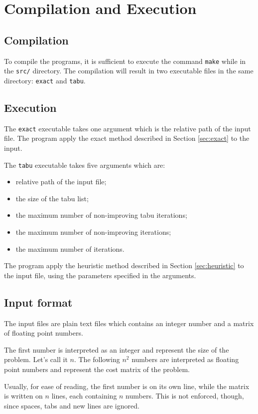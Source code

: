 \documentclass{article}
\begin{document}
\section{Compilation and Execution}

\subsection{Compilation}
To compile the programs, it is sufficient to execute the command \texttt{make} while in the \texttt{src/} directory.
The compilation will result in two executable files in the same directory: \texttt{exact} and \texttt{tabu}.

\subsection{Execution}
The \texttt{exact} executable takes one argument which is the relative path of the input file.
The program apply the exact method described in Section \ref{sec:exact} to the input.

The \texttt{tabu} executable takes five arguments which are:
\begin{itemize}
    \item relative path of the input file;
    \item the size of the tabu list;
    \item the maximum number of non-improving tabu iterations;
    \item the maximum number of non-improving iterations;
    \item the maximum number of iterations.
\end{itemize}
The program apply the heuristic method described in Section \ref{sec:heuristic} to the input file, using the parameters specified in the arguments.

\subsection{Input format}
The input files are plain text files which contains an integer number and a matrix of floating point numbers.

The first number is interpreted as an integer and represent the size of the problem. Let's call it $n$.
The following $n^2$ numbers are interpreted as floating point numbers and represent the cost matrix of the problem.


Usually, for ease of reading, the first number is on its own line, while the matrix is written on $n$ lines, each containing $n$ numbers.
This is not enforced, though, since spaces, tabs and new lines are ignored.
\end{document}
